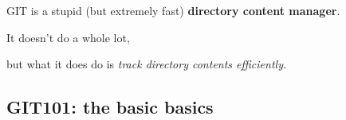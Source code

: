 \documentclass{ximera}
\begin{document}
    \author{Wim Obbels}
    \label{xim:gitconcepts}



\begin{definition}\nl

GIT is a stupid (but extremely fast) \textbf{directory content manager}.  

It doesn't do a whole lot, 

but what it does do is\textit{ track directory contents efficiently. }
\end{definition}

\subsection{GIT101: the basic basics}
\end{document}
